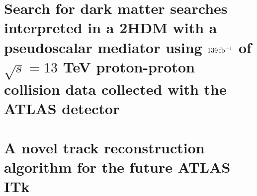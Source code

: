 \documentclass[12pt]{withesis}
\begin{document}

% 
\setcounter{page}{0}
% 
% 
% 

\tableofcontents
\cleardoublepage
{} %
\listoffigures
\cleardoublepage
{} %
\listoftables


\setlength{\parskip}{1em}


\part{Search for dark matter searches interpreted in a 2HDM with a pseudoscalar mediator using $139\, \mbox{fb\(^{-1}\)}$ of $\sqrt{s}=13$ TeV proton-proton collision data collected with the ATLAS detector}





\part{A novel track reconstruction algorithm for the future ATLAS ITk}



% 



% 
% 

% 
% 


% 
% 
% 
% 




% 
\end{document}
